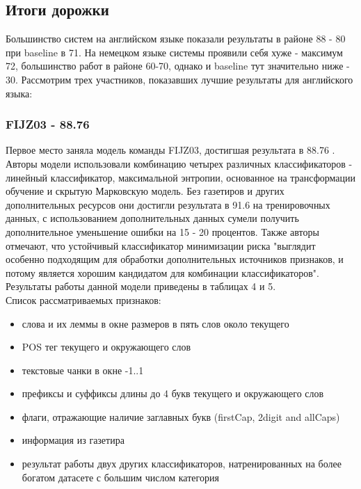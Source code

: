\subsection{Итоги дорожки}

Большинство систем на английском языке показали результаты в районе 88 - 80 при baseline в 71. На немецком языке системы проявили себя хуже - максимум 72, большинство работ в районе 60-70, однако и baseline тут значительно ниже - 30. Рассмотрим трех участников, показавших лучшие результаты для английского языка:

\subsubsection{FIJZ03 - 88.76}

Первое место заняла модель команды FIJZ03, достигшая результата в 88.76 \cite{Florian:2003:NER:1119176.1119201}. Авторы модели использовали комбинацию четырех различных классификаторов - линейный классификатор, максимальной энтропии, основанное на трансформации обучение и скрытую Марковскую модель. Без газетиров и других дополнительных ресурсов они достигли результата в 91.6 на тренировочных данных, с использованием дополнительных данных сумели получить дополнительное уменьшение ошибки на 15 - 20 процентов. Также авторы отмечают, что устойчивый классификатор минимизации риска "выглядит особенно подходящим для обработки дополнительных источников признаков, и потому является хорошим кандидатом для комбинации классификаторов". Результаты работы данной модели приведены в таблицах 4 и 5.\\


Список рассматриваемых признаков:
\begin{itemize}
\setlength\itemsep{0em}
\item слова и их леммы в окне размеров в пять слов около текущего
\item POS тег текущего и окружающего слов
\item текстовые чанки в окне -1..1
\item префиксы и суффиксы длины до 4 букв текущего и окружающего слов
\item флаги, отражающие наличие заглавных букв (firstCap, 2digit and allCaps)
\item информация из газетира
\item результат работы двух других классификаторов, натренированных на более богатом датасете с большим числом категория
\end{itemize}

